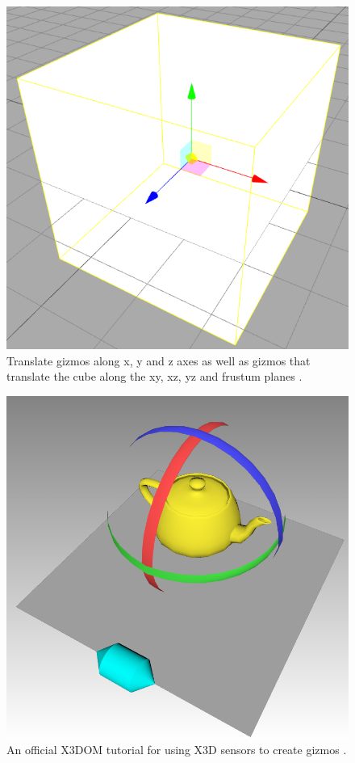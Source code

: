 \begin{figure}[]
  \centering
  \includegraphics[width=12cm]{../assets/threejs-editor.png}
	\caption{ Translate gizmos along x, y and z axes as well as gizmos that translate the cube along the xy, xz, yz and frustum planes \cite{threejseditor}.}
\end{figure}
\begin{figure}[]
  \centering
  \includegraphics[width=12cm]{../assets/x3dom-gizmo-example.png}
	\caption{ An official X3DOM tutorial for using X3D sensors to create gizmos \cite{x3dgizmo}. }
	\label{fig:x3dgizmo}
\end{figure}

